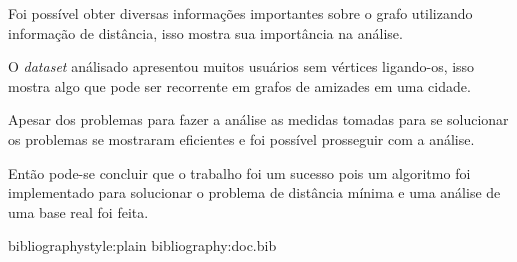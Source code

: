 \documentclass[11pt]{article}
\begin{document}
Foi possível obter diversas informações importantes sobre o grafo utilizando informação de distância, isso mostra sua importância na análise.

O \emph{dataset} análisado apresentou muitos usuários sem vértices ligando-os, isso mostra algo que pode ser recorrente em grafos de amizades em uma cidade.

Apesar dos problemas para fazer a análise as medidas tomadas para se solucionar os problemas se mostraram eficientes e foi possível prosseguir com a análise.

Então pode-se concluir que o trabalho foi um sucesso pois um algoritmo foi implementado para solucionar o problema de distância mínima e uma análise de uma base real foi feita.



bibliographystyle:plain
bibliography:doc.bib
\end{document}
